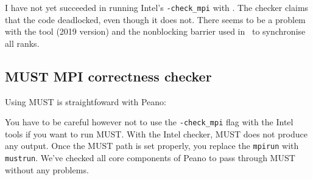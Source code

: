 \begin{remark}
 I have not yet succeeded in running Intel's \texttt{-check\_mpi} with \ExaHyPE.
 The checker claims that the code deadlocked, even though it does not. There
 seems to be a problem with the tool (2019 version) and the nonblocking barrier
 used in \ExaHyPE\ to synchronise all ranks.
\end{remark}


\subsection{MUST MPI correctness checker}
\label{section:supercomputers:MUST}

Using MUST is straightfoward with Peano:


\noindent
You have to be careful however not to use the \texttt{-check\_mpi} flag with the
Intel tools if you want to run MUST.
With the Intel checker, MUST does not produce any output.
Once the MUST path is set properly, you replace the \texttt{mpirun} with
\texttt{mustrun}.
We've checked all core components of Peano to pass through MUST without any
problems.


% 
% 

 
% 
% 
% 
% 
% 
% 
% 
% 
% 
% 
% 
% 
% 
